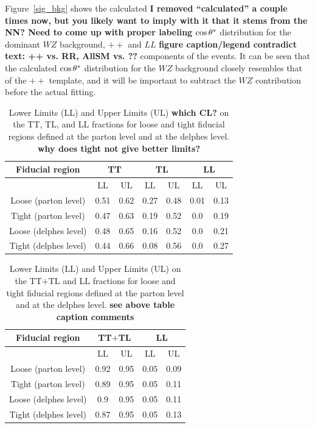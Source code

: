 Figure~\ref{sig_bkg} shows the calculated {\bf I removed
  ``calculated'' a couple times now, but you likely want to imply with
  it that it stems from the NN? Need to come up with proper labeling}
$ \cos \theta^{*}  $ distribution for the dominant $WZ$ background, $++$ and $LL$
{\bf figure caption/legend contradict text: ++ vs. RR, AllSM vs. ??}
components of the \ssWW events.  It can be seen that the calculated
$ \cos \theta^{*}  $ distribution for the $WZ$ background closely resembles that of
the $++$ template, and it will be important to subtract the $WZ$
contribution before the actual fitting.

\begin{table}[h!]
\begin{center}
\begin{tabular}{c |cc|cc|cc}
\hline \hline
Fiducial region & \multicolumn{2}{c|}{TT} & \multicolumn{2}{c|}{TL}  & \multicolumn{2}{c}{LL} \\
\hline
 & LL & UL & LL & UL & LL & UL  \\
\hline
Loose (parton level) & 0.51 & 0.62 &0.27 & 0.48 &0.01 & 0.13\\ 
Tight (parton level) & 0.47 & 0.63 &0.19 & 0.52 &0.0 & 0.19\\ 
Loose ({\sc delphes} level) & 0.48 & 0.65 &0.16 & 0.52 &0.0 & 0.21\\ 
Tight ({\sc delphes} level) & 0.44 & 0.66 &0.08 & 0.56 &0.0 & 0.27\\ 
\hline
\hline
\end{tabular}
\caption{\label{tab:sens} Lower Limits (LL) and Upper Limits (UL) {\bf
    which CL?} on the TT, TL, and LL fractions for loose and tight
  fiducial regions defined at the parton level and at the {\sc
    delphes} level. {\bf why does tight not give better limits?} }
\end{center}
\end{table}

\begin{table}[h!]
\begin{tabular}{c |cc|cc}
\hline \hline
Fiducial region & \multicolumn{2}{c|}{TT$+$TL} & \multicolumn{2}{c}{LL} \\
\hline
 & LL & UL & LL & UL  \\
\hline
Loose (parton level) & 0.92 & 0.95 &0.05 & 0.09\\ 
Tight (parton level) & 0.89 & 0.95 &0.05 & 0.11\\ 
Loose ({\sc delphes} level) & 0.9 & 0.95 &0.05 & 0.11\\ 
Tight ({\sc delphes} level) & 0.87 & 0.95 &0.05 & 0.13\\ 
\hline
\hline
\end{tabular}
\caption{\label{tab:sens2}Lower Limits (LL) and Upper Limits (UL) on
  the TT$+$TL and LL fractions for loose and tight fiducial regions
  defined at the parton level and at the {\sc delphes} level. {\bf see
    above table caption comments}}
\end{table}

